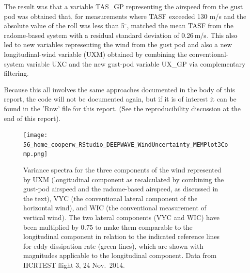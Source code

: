 \documentclass[12pt,twoside,english]{article}\usepackage[]{graphicx}\usepackage[]{color}
\let\OrgIndex\index
\renewcommand*{\index}[1]{\OrgIndex{#1}}
\begin{document}
The result was that a variable TAS\_GP representing the airspeed from the gust pod was obtained that, for measurements where TASF exceeded 130 m/s and the absolute value of the roll was less than 5$^{\circ}$, matched the mean TASF from the radome-based system with a residual standard deviation of 0.26\,m/s. This also led to new variables representing the wind from the gust pod and also a new longitudinal-wind variable (UXM) obtained by combining the conventional-system variable UXC and the new gust-pod variable UX\_GP via complementary filtering. 

Because this all involves the same approaches documented in the body of this report, the code will not be documented again, but if it is of interest it can be found in the 'Rnw' file for this report. (See the reproducibility discussion at the end of this report). 












\begin{figure}
\noindent \begin{centering}
\texttt{[image: 56\_home\_cooperw\_RStudio\_DEEPWAVE\_WindUncertainty\_MEMPlot3Comp.png]}  
\par\end{centering}

\protect\caption[Variance spectra for the three components of the wind.]{\label{fig:AppxB-3Comp}Variance spectra for the three components of the wind represented by UXM (longitudinal component as recalculated by combining the gust-pod airspeed and the radome-based airspeed, as discussed in the text), VYC (the conventional lateral component of the horizontal wind), and WIC (the conventional measurement of vertical wind). The two lateral components (VYC and WIC) have been multiplied by 0.75 to make them comparable to the longitudinal component in relation to the indicated reference lines for eddy dissipation rate (green lines), which are shown with magnitudes applicable to the longitudinal component. Data from HCRTEST flight 3, 24 Nov.\ 2014.} 
\end{figure}
\end{document}
